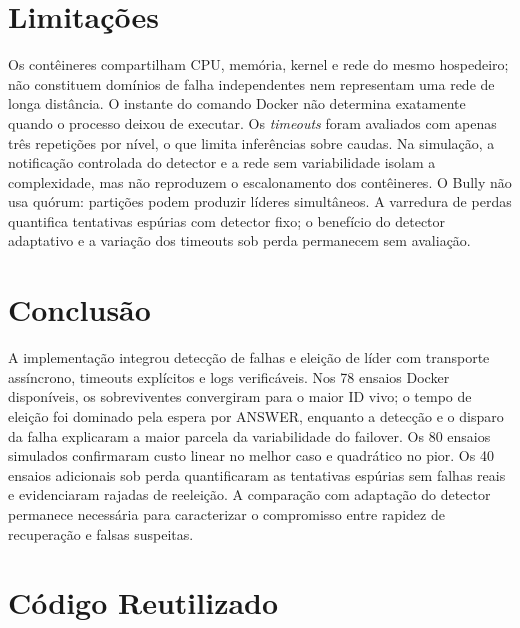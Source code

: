\documentclass[conference]{IEEEtran}
\begin{document}
\section{Limitações}
\label{sec:limitacoes}

Os contêineres compartilham CPU, memória, kernel e rede do mesmo hospedeiro; não constituem domínios de falha independentes nem representam uma rede de longa distância. O instante do comando Docker não determina exatamente quando o processo deixou de executar. Os \textit{timeouts} foram avaliados com apenas três repetições por nível, o que limita inferências sobre caudas. Na simulação, a notificação controlada do detector e a rede sem variabilidade isolam a complexidade, mas não reproduzem o escalonamento dos contêineres. O Bully não usa quórum: partições podem produzir líderes simultâneos. A varredura de perdas quantifica tentativas espúrias com detector fixo; o benefício do detector adaptativo e a variação dos timeouts sob perda permanecem sem avaliação.

\section{Conclusão}
\label{sec:conclusao}

A implementação integrou detecção de falhas e eleição de líder com transporte assíncrono, timeouts explícitos e logs verificáveis. Nos 78 ensaios Docker disponíveis, os sobreviventes convergiram para o maior ID vivo; o tempo de eleição foi dominado pela espera por ANSWER, enquanto a detecção e o disparo da falha explicaram a maior parcela da variabilidade do failover. Os 80 ensaios simulados confirmaram custo linear no melhor caso e quadrático no pior. Os 40 ensaios adicionais sob perda quantificaram as tentativas espúrias sem falhas reais e evidenciaram rajadas de reeleição. A comparação com adaptação do detector permanece necessária para caracterizar o compromisso entre rapidez de recuperação e falsas suspeitas.

\section*{Código Reutilizado}
\end{document}

